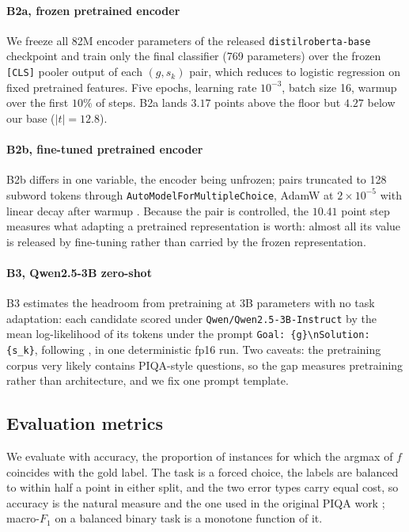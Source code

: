 \documentclass[11pt]{article}
\begin{document}
\paragraph{B2a, frozen pretrained encoder}
We freeze all 82M encoder parameters of the released
\texttt{distilroberta-base} checkpoint
\citep{sanh2019distilbert,liu2019roberta} and train only the final classifier
(769 parameters) over the frozen \texttt{[CLS]} pooler output of each
$(g,s_k)$ pair, which reduces to logistic regression on fixed pretrained
features. Five epochs, learning rate $10^{-3}$, batch size 16, warmup over the
first $10\%$ of steps. B2a lands $3.17$ points above the floor but $4.27$
below our base ($|t|=12.8$).

\paragraph{B2b, fine-tuned pretrained encoder}
B2b differs in one variable, the encoder being unfrozen; pairs truncated to
128 subword tokens through \texttt{AutoModelForMultipleChoice}, AdamW at
$2\times10^{-5}$ with linear decay after warmup \citep{mosbach2021stability}.
Because the pair is controlled, the $10.41$ point step measures what adapting
a pretrained representation is worth: almost all its value is released by
fine-tuning rather than carried by the frozen representation.

\paragraph{B3, Qwen2.5-3B zero-shot}
B3 estimates the headroom from pretraining at 3B parameters with no task
adaptation: each candidate scored under
\texttt{Qwen/Qwen2.5-3B-Instruct} by the mean log-likelihood of its tokens
under the prompt \texttt{Goal: \{g\}\textbackslash nSolution:
\{s\_k\}}, following \citet{bisk2020piqa}, in one deterministic fp16 run.
Two caveats: the pretraining corpus very likely contains PIQA-style questions,
so the gap measures pretraining rather than architecture, and we fix one
prompt template.

\subsection{Evaluation metrics}

We evaluate with accuracy, the proportion of instances for which the argmax
of $f$ coincides with the gold label. The task is a forced choice, the labels
are balanced to within half a point in either split, and the two error types
carry equal cost, so accuracy is the natural measure and the one used in the
original PIQA work \citep{bisk2020piqa}; macro-$F_1$ on a balanced binary task
is a monotone function of it.
\end{document}
